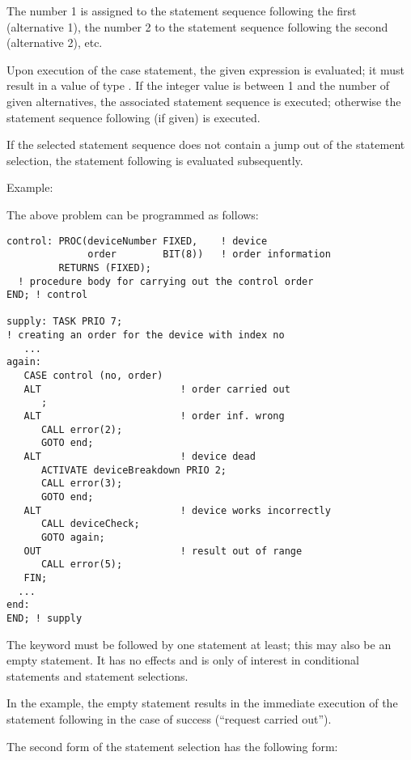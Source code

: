 The number 1 is assigned to the statement sequence following the first
 (alternative 1), the number 2 to the statement sequence following
the second  (alternative 2), etc.

Upon execution of the case statement, the given expression is
evaluated; it must result in a value of type . If the integer value
is between 1 and the number of given alternatives, the associated
statement sequence is executed; otherwise the statement sequence
following  (if given) is executed.

If the selected statement sequence does not contain a jump out of the
statement selection, the statement following  is evaluated
subsequently.

Example:

The above problem can be programmed as follows:

\begin{lstlisting}
control: PROC(deviceNumber FIXED,    ! device 
              order        BIT(8))   ! order information
         RETURNS (FIXED);  
  ! procedure body for carrying out the control order
END; ! control 
 
supply: TASK PRIO 7;
! creating an order for the device with index no 
   ... 
again:  
   CASE control (no, order)
   ALT                        ! order carried out 
      ; 
   ALT                        ! order inf. wrong 
      CALL error(2);
      GOTO end;
   ALT                        ! device dead
      ACTIVATE deviceBreakdown PRIO 2;
      CALL error(3);
      GOTO end;
   ALT                        ! device works incorrectly
      CALL deviceCheck;
      GOTO again;
   OUT                        ! result out of range
      CALL error(5);
   FIN; 
  ...         
end: 
END; ! supply 
\end{lstlisting}

The keyword  must be followed by
one statement at least; this may also be an empty statement. It has no
effects and is only of interest in conditional statements and statement
selections.

In the example, the empty statement results in the immediate execution
of the statement following  in the case of success (``request carried
out'').


The second form of the statement selection has the following form:

\begin{grammarframe}




\end{grammarframe}

